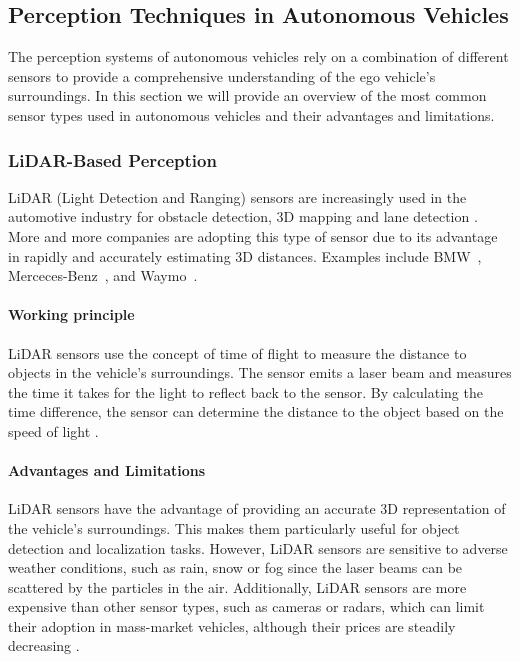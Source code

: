 \subsection{Perception Techniques in Autonomous Vehicles}

The perception systems of autonomous vehicles rely on a combination of different sensors to provide a 
comprehensive understanding of the ego vehicle's surroundings. In this section we will provide an overview of
the most common sensor types used in autonomous vehicles and their advantages and limitations.


\subsubsection{LiDAR-Based Perception}

LiDAR (Light Detection and Ranging) sensors are increasingly used in the automotive industry for 
obstacle detection, 3D mapping and lane detection \cite{autonomous_vehicles_perception_survey}. More and more companies are adopting this type of sensor due to its advantage 
in rapidly and accurately estimating 3D distances. Examples include BMW~\cite{lidarbased_bmw}, 
Merceces-Benz~\cite{lidarbased_mercedes}, and Waymo~\cite{lidarbased_waymo}.

\paragraph{Working principle}

LiDAR sensors use the concept of time of flight to measure the distance to objects in the vehicle's surroundings.
The sensor emits a laser beam and measures the time it takes for the light to reflect back to the sensor.
By calculating the time difference, the sensor can determine the distance to the object based 
on the speed of light \cite{lidarbased_review}.

\paragraph{Advantages and Limitations}

LiDAR sensors have the advantage of providing an accurate 3D representation of the vehicle's surroundings.
This makes them particularly useful for object detection and localization tasks. However, LiDAR sensors
are sensitive to adverse weather conditions, such as rain, snow or fog since the laser beams can be scattered
by the particles in the air. Additionally, LiDAR sensors are more expensive than other sensor types, such as
cameras or radars, which can limit their adoption in mass-market vehicles, although their prices are steadily decreasing \cite{autonomous_vehicles_perception_survey}.

